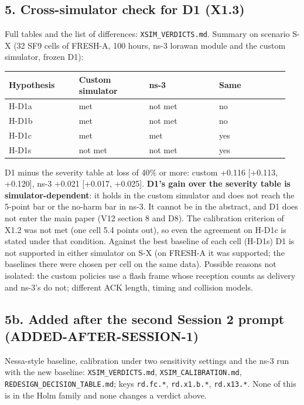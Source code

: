 \subsection*{5. Cross-simulator check for D1 (X1.3)}

Full tables and the list of differences: \texttt{XSIM\_VERDICTS.md}. Summary on scenario S-X (32 SF9 cells of FRESH-A, 100 hours, ns-3 lorawan module and the custom simulator, frozen D1):

{\scriptsize\raggedright
\begin{longtable}{p{0.237\linewidth}p{0.237\linewidth}p{0.237\linewidth}p{0.237\linewidth}}
\toprule
Hypothesis & Custom simulator & ns-3 & Same \\
\midrule
\endhead
H-D1a & met & not met & no \\
H-D1b & met & not met & no \\
H-D1c & met & met & yes \\
H-D1s & not met & not met & yes \\
\bottomrule
\end{longtable}}

D1 minus the severity table at loss of 40\% or more: custom +0.116 [+0.113, +0.120], ns-3 +0.021 [+0.017, +0.025]. \textbf{D1's gain over the severity table is simulator-dependent}: it holds in the custom simulator and does not reach the 5-point bar or the no-harm bar in ns-3. It cannot be in the abstract, and D1 does not enter the main paper (V12 section 8 and D8). The calibration criterion of X1.2 was not met (one cell 5.4 points out), so even the agreement on H-D1c is stated under that condition. Against the best baseline of each cell (H-D1s) D1 is not supported in either simulator on S-X (on FRESH-A it was supported; the baselines there were chosen per cell on the same data). Possible reasons not isolated: the custom policies use a flash frame whose reception counts as delivery and ns-3's do not; different ACK length, timing and collision models.

\subsection*{5b. Added after the second Session 2 prompt (ADDED-AFTER-SESSION-1)}

Nessa-style baseline, calibration under two sensitivity settings and the ns-3 run with the new baseline: \texttt{XSIM\_VERDICTS.md}, \texttt{XSIM\_CALIBRATION.md}, \texttt{REDESIGN\_DECISION\_TABLE.md}; keys \texttt{rd.fc.*}, \texttt{rd.x1.b.*}, \texttt{rd.x13.*}. None of this is in the Holm family and none changes a verdict above.


